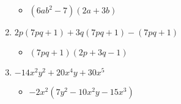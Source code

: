 \begin{enumerate}
  \begin{itemize}
  \item $(6ab^{2}-7)(2a+3b)$
  \end{itemize}
\item $2p(7pq+1) + 3q(7pq+1) - (7pq+1)$
  \begin{itemize}
  \item $(7pq+1)(2p+3q-1)$
  \end{itemize}
\item $-14x^{2}y^{2} + 20x^{4}y + 30x^{5}$
  \begin{itemize}
  \item $-2x^{2}(7y^{2}-10x^{2}y-15x^{3})$
  \end{itemize}
\end{enumerate}
